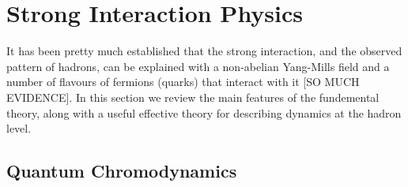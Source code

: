 \section{Strong Interaction Physics}
\label{sec:stronginteractions}

It has been pretty much established that the strong interaction, and the observed pattern of hadrons, can be explained with a non-abelian Yang-Mills field and a number of flavours of fermions (quarks) that interact with it [SO MUCH EVIDENCE]. In this section we review the main features of the fundemental theory, along with a useful effective theory for describing dynamics at the hadron level. 

\subsection{Quantum Chromodynamics}

{}

